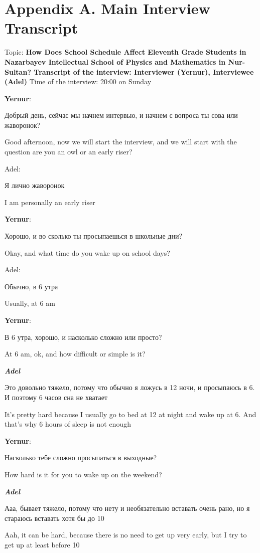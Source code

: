 \newpage
\section{\textbf{Appendix A. Main Interview Transcript}}

Topic: \textbf{How Does School Schedule Affect Eleventh Grade Students in Nazarbayev Intellectual School of Physics and Mathematics in Nur-Sultan?
Transcript of the interview: Interviewer (\textbf{Yernur}), Interviewee (Adel)}
Time of the interview: 20:00 on Sunday

\textbf{Yernur}: 

Добрый день, сейчас мы начнем интервью, и начнем с вопроса ты сова или жаворонок?

Good afternoon, now we will start the interview, and we will start with the question are you an owl or an early riser?

Adel:

Я лично жаворонок

I am personally an early riser

\textbf{Yernur}:

Хорошо, и во сколько ты просыпаешься в школьные дни?

Okay, and what time do you wake up on school days?

Adel:

Обычно, в 6 утра

Usually, at 6 am

\textbf{Yernur}: 

В 6 утра, хорошо, и насколько сложно или просто?

At 6 am, ok, and how difficult or simple is it?

\textbf{\textit{Adel}}

Это довольно тяжело, потому что обычно я ложусь в 12 ночи, и просыпаюсь в 6. И поэтому 6 часов сна не хватает

It's pretty hard because I usually go to bed at 12 at night and wake up at 6. And that's why 6 hours of sleep is not enough

\textbf{Yernur}:

Насколько тебе сложно просыпаться в выходные?

How hard is it for you to wake up on the weekend?

\textbf{\textit{Adel}}

Ааа, бывает тяжело, потому что нету и необязательно вставать очень рано, но я стараюсь вставать хотя бы до 10 

Aah, it can be hard, because there is no need to get up very early, but I try to get up at least before 10


